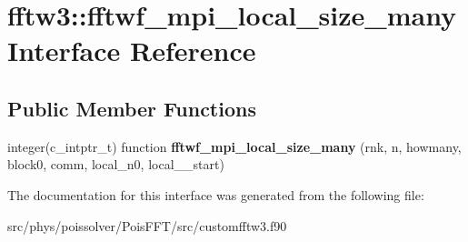 \hypertarget{interfacefftw3_1_1fftwf__mpi__local__size__many}{}\section{fftw3\+:\+:fftwf\+\_\+mpi\+\_\+local\+\_\+size\+\_\+many Interface Reference}
\label{interfacefftw3_1_1fftwf__mpi__local__size__many}
\subsection*{Public Member Functions}
\begin{DoxyCompactItemize}
\item 
integer(c\+\_\+intptr\+\_\+t) function {\bfseries fftwf\+\_\+mpi\+\_\+local\+\_\+size\+\_\+many} (rnk, n, howmany, block0, comm, local\+\_\+n0, local\+\_\+\_\+start)\hypertarget{interfacefftw3_1_1fftwf__mpi__local__size__many_a419625d9da1706f620aa32d324196d26}{}\label{interfacefftw3_1_1fftwf__mpi__local__size__many_a419625d9da1706f620aa32d324196d26}

\end{DoxyCompactItemize}


The documentation for this interface was generated from the following file\+:\begin{DoxyCompactItemize}
\item 
src/phys/poissolver/\+Pois\+F\+F\+T/src/customfftw3.\+f90\end{DoxyCompactItemize}

